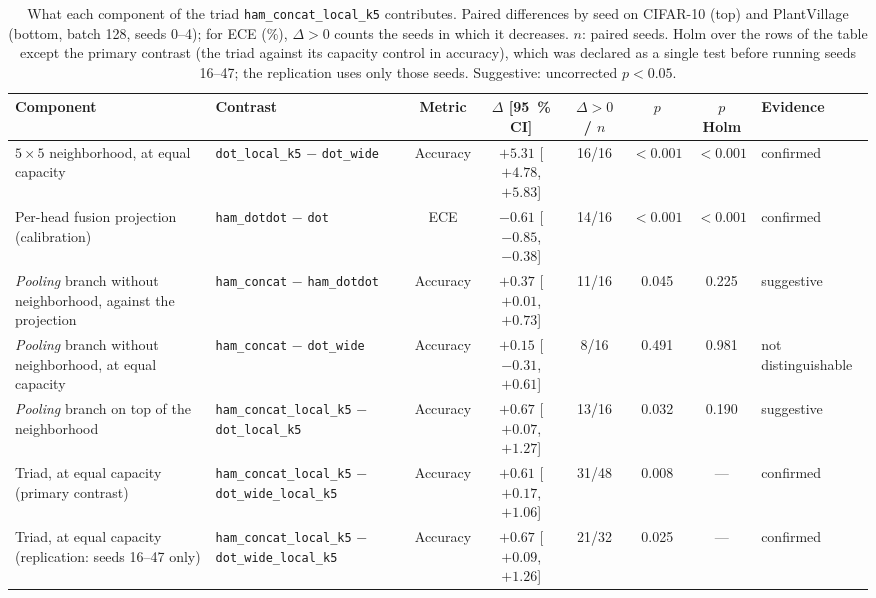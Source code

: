 
\begin{table}[!t]
\centering
\footnotesize
\caption{What each component of the triad \texttt{ham\_concat\_local\_k5} contributes. Paired differences by seed on CIFAR-10 (top) and PlantVillage (bottom, batch 128, seeds 0--4); for ECE (\%), $\Delta>0$ counts the seeds in which it decreases. $n$: paired seeds. Holm over the rows of the table except the primary contrast (the triad against its capacity control in accuracy), which was declared as a single test before running seeds 16--47; the replication uses only those seeds. Suggestive: uncorrected $p<0.05$.}
\label{tab:evidencia}
\begin{adjustbox}{max width=\linewidth}
\begin{tabular}{>{\raggedright\arraybackslash}p{4.4cm}lccccc>{\raggedright\arraybackslash}p{1.9cm}}
\toprule
Component & Contrast & Metric & $\Delta$ [95~\% CI] & $\Delta>0$ / $n$ & $p$ & $p$ Holm & Evidence \\
\midrule
$5\times5$ neighborhood, at equal capacity & \texttt{dot\_local\_k5} $-$ \texttt{dot\_wide} & Accuracy & $+5.31$ [$+4.78$, $+5.83$] & 16/16 & $<0.001$ & $<0.001$ & confirmed \\
Per-head fusion projection (calibration) & \texttt{ham\_dotdot} $-$ \texttt{dot} & ECE & $-0.61$ [$-0.85$, $-0.38$] & 14/16 & $<0.001$ & $<0.001$ & confirmed \\
\emph{Pooling} branch without neighborhood, against the projection & \texttt{ham\_concat} $-$ \texttt{ham\_dotdot} & Accuracy & $+0.37$ [$+0.01$, $+0.73$] & 11/16 & 0.045 & 0.225 & suggestive \\
\emph{Pooling} branch without neighborhood, at equal capacity & \texttt{ham\_concat} $-$ \texttt{dot\_wide} & Accuracy & $+0.15$ [$-0.31$, $+0.61$] & 8/16 & 0.491 & 0.981 & not distinguishable \\
\emph{Pooling} branch on top of the neighborhood & \texttt{ham\_concat\_local\_k5} $-$ \texttt{dot\_local\_k5} & Accuracy & $+0.67$ [$+0.07$, $+1.27$] & 13/16 & 0.032 & 0.190 & suggestive \\
Triad, at equal capacity (primary contrast) & \texttt{ham\_concat\_local\_k5} $-$ \texttt{dot\_wide\_local\_k5} & Accuracy & $+0.61$ [$+0.17$, $+1.06$] & 31/48 & 0.008 & --- & confirmed \\
Triad, at equal capacity (replication: seeds 16--47 only) & \texttt{ham\_concat\_local\_k5} $-$ \texttt{dot\_wide\_local\_k5} & Accuracy & $+0.67$ [$+0.09$, $+1.26$] & 21/32 & 0.025 & --- & confirmed \\

\end{tabular}
\end{adjustbox}
\end{table}

